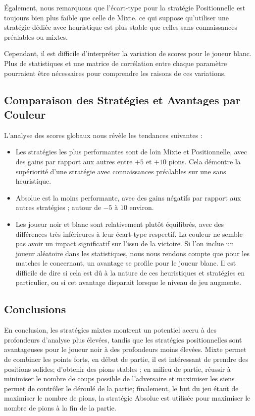 Également, nous remarquons que l'écart-type pour la stratégie Positionnelle est toujours bien plus faible que celle de Mixte. ce qui suppose qu'utiliser une stratégie dédiée avec heuristique est plus stable que celles sans connaissances préalables ou mixtes.

Cependant, il est difficile d'interpréter la variation de scores pour le joueur blanc. Plus de statistiques et une matrice de corrélation entre chaque paramètre pourraient être nécessaires pour comprendre les raisons de ces variations.

\subsection{Comparaison des Stratégies et Avantages par Couleur}

L'analyse des scores globaux nous révèle les tendances suivantes :

\begin{itemize}
    \item Les stratégies les plus performantes sont de loin Mixte et Positionnelle, avec des gains par rapport aux autres entre $+5$ et $+10$ pions. Cela démontre la supériorité d'une stratégie avec connaissances préalables sur une sans heuristique.
    \item Absolue est la moins performante, avec des gains négatifs par rapport aux autres stratégies ; autour de $-5$ à $10$ environ.
    \item Les joueur noir et blanc sont relativement plutôt équilibrés, avec des différences très inférieures à leur écart-type respectif. La couleur ne semble pas avoir un impact significatif sur l'issu de la victoire. Si l'on inclue un joueur aléatoire dans les statistiques, nous nous rendons compte que pour les matches le concernant, un avantage se profile pour le joueur blanc. Il est difficile de dire si cela est dû à la nature de ces  heuristiques et stratégies en particulier, ou si cet avantage disparait lorsque le niveau de jeu augmente.
\end{itemize}

\subsection*{Conclusions}

En conclusion, les stratégies mixtes montrent un potentiel accru à des profondeurs d'analyse plus élevées, tandis que les stratégies positionnelles sont avantageuses pour le joueur noir à des profondeurs moins élevées. Mixte permet de combiner les points forts, en début de partie, il est intéressant de prendre des positions solides; d'obtenir des pions stables ; en milieu de partie, réussir à minimiser le nombre de coups possible de l'adversaire et maximiser les siens permet de contrôler le déroulé de la partie; finalement, le but du jeu étant de maximiser le nombre de pions, la stratégie Absolue est utilisée pour maximiser le nombre de pions à la fin de la partie.